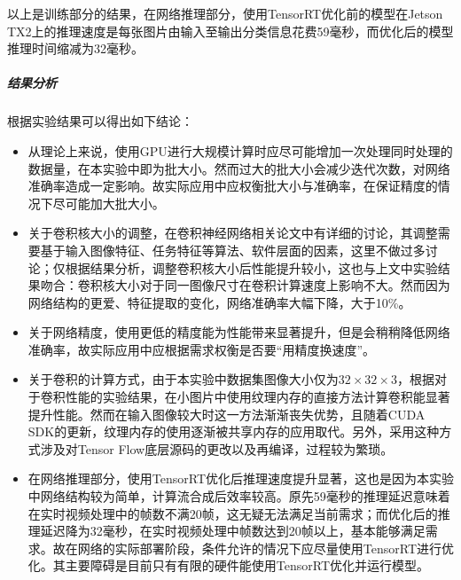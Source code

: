 \par 以上是训练部分的结果，在网络推理部分，使用TensorRT优化前的模型在Jetson TX2上的推理速度是每张图片由输入至输出分类信息花费59毫秒，而优化后的模型推理时间缩减为32毫秒。
\subparagraph{结果分析}
\par 根据实验结果可以得出如下结论：
\begin{itemize}
	\item 从理论上来说，使用GPU进行大规模计算时应尽可能增加一次处理同时处理的数据量，在本实验中即为批大小。然而过大的批大小会减少迭代次数，对网络准确率造成一定影响。故实际应用中应权衡批大小与准确率，在保证精度的情况下尽可能加大批大小。
	\item 关于卷积核大小的调整，在卷积神经网络相关论文中有详细的讨论，其调整需要基于输入图像特征、任务特征等算法、软件层面的因素，这里不做过多讨论；仅根据结果分析，调整卷积核大小后性能提升较小，这也与上文中实验结果吻合：卷积核大小对于同一图像尺寸在卷积计算速度上影响不大。然而因为网络结构的更爱、特征提取的变化，网络准确率大幅下降，大于10\%。
	\item 关于网络精度，使用更低的精度能为性能带来显著提升，但是会稍稍降低网络准确率，故实际应用中应根据需求权衡是否要“用精度换速度”。
	\item 关于卷积的计算方式，由于本实验中数据集图像大小仅为$ 32\times 32\times 3 $，根据对于卷积性能的实验结果，在小图片中使用纹理内存的直接方法计算卷积能显著提升性能。然而在输入图像较大时这一方法渐渐丧失优势，且随着CUDA SDK的更新，纹理内存的使用逐渐被共享内存的应用取代。另外，采用这种方式涉及对Tensor Flow底层源码的更改以及再编译，过程较为繁琐。
	\item 在网络推理部分，使用TensorRT优化后推理速度提升显著，这也是因为本实验中网络结构较为简单，计算流合成后效率较高。原先59毫秒的推理延迟意味着在实时视频处理中的帧数不满20帧，这无疑无法满足当前需求；而优化后的推理延迟降为32毫秒，在实时视频处理中帧数达到20帧以上，基本能够满足需求。故在网络的实际部署阶段，条件允许的情况下应尽量使用TensorRT进行优化。其主要障碍是目前只有有限的硬件能使用TensorRT优化并运行模型。
\end{itemize}
